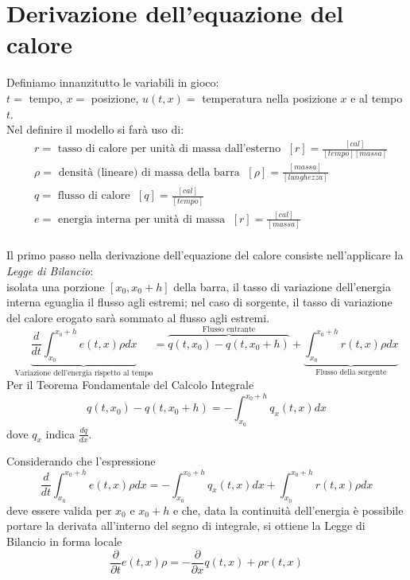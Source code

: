 \section{Derivazione dell'equazione del calore}
Definiamo innanzitutto le variabili in gioco:\\
$t=$ tempo, $x=$ posizione, $u(t,x)=$ temperatura nella posizione $x$ e al tempo $t$.\\
Nel definire il modello si far\`a uso di:
%
\begin{align*}
& r= \mbox{ tasso di calore per unit\`a di massa dall'esterno } \; [r]=\frac{[cal]}{[tempo][massa]}\\
& \rho= \mbox{ densit\`a (lineare) di massa della barra } \; [\rho]=\frac{[massa]}{[lunghezza]}\\
& q= \mbox{ flusso di calore } \; [q]=\frac{[cal]}{[tempo]}\\
& e= \mbox{ energia interna per unit\`a di massa } \; [r]=\frac{[cal]}{[massa]}\\
\end{align*}

Il primo passo nella derivazione dell'equazione del calore consiste nell'applicare la \textit{Legge di Bilancio}:\\
isolata una porzione $[x_0, x_0+h]$ della barra, il tasso di variazione dell'energia interna eguaglia il flusso agli estremi;
nel caso di sorgente, il tasso di variazione del calore erogato sar\`a sommato al flusso agli estremi.
\[
	\underbrace{\frac{d}{dt}\int_{x_0}^{x_0+h} e(t,x)\rho dx}_\text{Variazione dell'energia rispetto al tempo}
	= \overbrace{q(t,x_0)-q(t,x_0 +h)}^\text{Flusso entrante}
	+\underbrace{\int_{x_0}^{x_0+h} r(t,x) \rho dx}_\text{Flusso della sorgente}
\]
Per il Teorema Fondamentale del Calcolo Integrale
\[
	q(t,x_0)-q(t,x_0 +h) = -\int_{x_0}^{x_0+h} q_x(t,x)dx
\]
dove $q_x$ indica $\frac{dq}{dx}$.

Considerando che l'espressione 
\[
	\frac{d}{dt}\int_{x_0}^{x_0+h} e(t,x)\rho dx
	= -\int_{x_0}^{x_0+h} q_x(t,x)dx
	+\int_{x_0}^{x_0+h} r(t,x) \rho dx
\]
deve essere valida per $x_0$ e $x_0+h$ e che, data la continuit\`a dell'energia \`e possibile portare 
la derivata all'interno del segno di integrale, si ottiene la Legge di Bilancio in forma locale
\[
	\frac{\partial}{\partial t} e(t,x)\rho= -\frac{\partial}{\partial x}q(t,x)+\rho r(t,x)
\]

